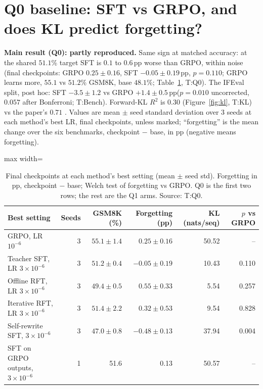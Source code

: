 \documentclass[11pt]{article}
\newcommand{\pp}{\,pp\xspace}
\newcommand{\T}[1]{\textsf{T:#1}}
\begin{document}
\section{Q0 baseline: SFT vs GRPO, and does KL predict forgetting?}
\label{sec:q0}
\textbf{Main result (Q0): partly reproduced.} Same sign at matched accuracy: at the shared $51.1$\% target SFT is
$0.1$ to $0.6$\pp worse than GRPO, within noise (final checkpoints: GRPO $0.25 \pm 0.16$, SFT $-0.05 \pm 0.19$\pp,
$p = 0.110$; GRPO learns more, $55.1$ vs $51.2$\% GSM8K, base $48.1$\%; Table~\ref{tab:headline}, \T{Q0}). The
IFEval split, post hoc: SFT $-3.5 \pm 1.2$ vs GRPO $+1.4 \pm 0.5$\pp ($p = 0.010$ uncorrected, $0.057$ after Bonferroni; \T{Bench}). Forward-KL $R^2$ is
$0.30$ (Figure~\ref{fig:kl}, \T{KL}) vs the paper's $0.71$ \cite[\S4, p.~6]{razor}. Values are mean $\pm$ seed
standard deviation over 3 seeds at each method's best LR, final checkpoints, unless marked; ``forgetting'' is the
mean change over the six benchmarks, checkpoint $-$ base, in pp (negative means forgetting).

\begin{table}[!htb]
\centering\small
\caption{Final checkpoints at each method's best setting (mean $\pm$ seed std). Forgetting in pp, checkpoint $-$
base; Welch test of forgetting vs GRPO. Q0 is the first two rows; the rest are the Q1 arms. Source: \T{Q0}.}
\label{tab:headline}
\begin{adjustbox}{max width=\linewidth}
\begin{tabular}{lrrrrr}
\toprule
Best setting & Seeds & GSM8K (\%) & Forgetting (pp) & KL (nats/seq) & $p$ vs GRPO\\
\midrule
GRPO, LR $10^{-6}$ & 3 & $55.1 \pm 1.4$ & $0.25 \pm 0.16$ & 50.52 & --\\
Teacher SFT, LR $3\times10^{-6}$ & 3 & $51.2 \pm 0.4$ & $-0.05 \pm 0.19$ & 10.43 & 0.110\\
\midrule
Offline RFT, LR $3\times10^{-6}$ & 3 & $49.4 \pm 0.5$ & $0.55 \pm 0.33$ & 5.54 & 0.257\\
Iterative RFT, LR $3\times10^{-6}$ & 3 & $51.4 \pm 2.2$ & $0.32 \pm 0.53$ & 9.54 & 0.828\\
Self-rewrite SFT, $3\times10^{-6}$ & 3 & $47.0 \pm 0.8$ & $-0.48 \pm 0.13$ & 37.94 & 0.004\\
SFT on GRPO outputs, $3\times10^{-6}$ & 1 & 51.6 & 0.13 & 50.57 & --\\
\bottomrule
\end{tabular}
\end{adjustbox}
\end{table}
\end{document}
